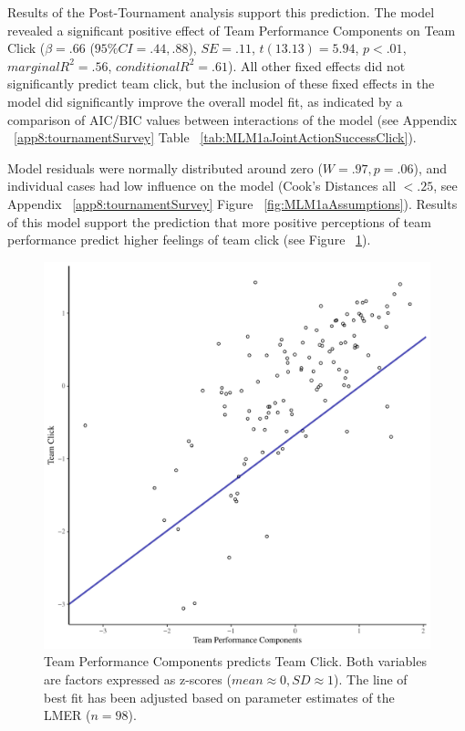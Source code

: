\begin{CJK}{UTF8}{gbsn}
Results of the Post-Tournament analysis support this prediction. The model revealed a significant positive effect of Team Performance Components on Team Click ($\beta = .66$ ($95\% CI =  .44, .88$), $SE = .11$, $t(13.13) = 5.94$, $p < .01$, $marginal R^2 = .56$, $conditional R^2 = .61$).  All other fixed effects did not significantly predict team click, but the inclusion of these fixed effects in the model did significantly improve the overall model fit, as indicated by a comparison of AIC/BIC values between interactions of the model (see Appendix ~\ref{app8:tournamentSurvey} Table ~\ref{tab:MLM1aJointActionSuccessClick}).

Model residuals were normally distributed around zero ($W = .97, p = .06$), and individual cases had low influence on the model (Cook's Distances all $< .25$, see Appendix ~\ref{app8:tournamentSurvey} Figure ~\ref{fig:MLM1aAssumptions}). Results of this model support the prediction that more positive perceptions of team performance predict higher feelings of team click (see Figure ~\ref{fig:jasClickModelSLope}).

\begin{figure}[htbp]
  \centering
\includegraphics[scale = .5]{images/jasClickModelSlope}
  \caption{Team Performance Components predicts Team Click. Both variables are factors expressed as z-scores ($mean \approx 0, SD \approx 1$).  The line of best fit has been adjusted based on parameter estimates of the LMER ($n = 98$).}
  \label{fig:jasClickModelSLope}
\end{figure}




\end{CJK}
